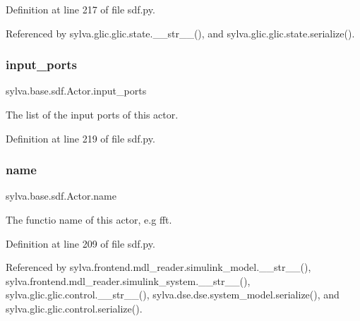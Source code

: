 Definition at line 217 of file sdf.\+py.



Referenced by sylva.\+glic.\+glic.\+state.\+\_\+\+\_\+str\+\_\+\+\_\+(), and sylva.\+glic.\+glic.\+state.\+serialize().

\mbox{\label{classsylva_1_1base_1_1sdf_1_1_actor_a00ccb05f3effbe2ec4bef76dd04f387d}} 
\subsubsection{\texorpdfstring{input\+\_\+ports}{input\_ports}}
{\footnotesize\ttfamily sylva.\+base.\+sdf.\+Actor.\+input\+\_\+ports}



The list of the input ports of this actor. 



Definition at line 219 of file sdf.\+py.

\mbox{\label{classsylva_1_1base_1_1sdf_1_1_actor_a76ca02f41b3d1fae9d3df33f94f2fcdf}} 
\subsubsection{\texorpdfstring{name}{name}}
{\footnotesize\ttfamily sylva.\+base.\+sdf.\+Actor.\+name}



The functio name of this actor, e.\+g fft. 



Definition at line 209 of file sdf.\+py.



Referenced by sylva.\+frontend.\+mdl\+\_\+reader.\+simulink\+\_\+model.\+\_\+\+\_\+str\+\_\+\+\_\+(), sylva.\+frontend.\+mdl\+\_\+reader.\+simulink\+\_\+system.\+\_\+\+\_\+str\+\_\+\+\_\+(), sylva.\+glic.\+glic.\+control.\+\_\+\+\_\+str\+\_\+\+\_\+(), sylva.\+dse.\+dse.\+system\+\_\+model.\+serialize(), and sylva.\+glic.\+glic.\+control.\+serialize().

\mbox{\label{classsylva_1_1base_1_1sdf_1_1_actor_a11fdbcea1b73039bad4996f5380277d8}} 
